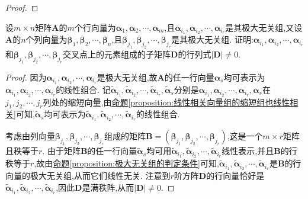 \documentclass[../../main.tex]{subfiles}%
\begin{document}
\begin{proof}
\end{proof}

\begin{proposition}\label{proposition:极大无关组对应的子式不为零}
设\(m\times n\)矩阵\(\boldsymbol{A}\)的\(m\)个行向量为\(\boldsymbol{\alpha}_1,\boldsymbol{\alpha}_2,\cdots,\boldsymbol{\alpha}_m\),且\(\boldsymbol{\alpha}_{i_1},\boldsymbol{\alpha}_{i_2},\cdots,\boldsymbol{\alpha}_{i_r}\)是其极大无关组,又设\(\boldsymbol{A}\)的\(n\)个列向量为\(\boldsymbol{\beta}_1,\boldsymbol{\beta}_2,\cdots,\boldsymbol{\beta}_n\),且\(\boldsymbol{\beta}_{j_1},\boldsymbol{\beta}_{j_2},\cdots,\boldsymbol{\beta}_{j_r}\)是其极大无关组. 证明:\(\boldsymbol{\alpha}_{i_1},\boldsymbol{\alpha}_{i_2},\cdots,\boldsymbol{\alpha}_{i_r}\)和\(\boldsymbol{\beta}_{j_1},\boldsymbol{\beta}_{j_2},\cdots,\boldsymbol{\beta}_{j_r}\)交叉点上的元素组成的子矩阵\(\boldsymbol{D}\)的行列式\(|\boldsymbol{D}|\neq0\).
\end{proposition}
\begin{proof}

因为\(\boldsymbol{\alpha}_{i_1},\boldsymbol{\alpha}_{i_2},\cdots,\boldsymbol{\alpha}_{i_r}\)是极大无关组,故\(\boldsymbol{A}\)的任一行向量\(\boldsymbol{\alpha}_s\)均可表示为\(\boldsymbol{\alpha}_{i_1},\boldsymbol{\alpha}_{i_2},\cdots,\boldsymbol{\alpha}_{i_r}\)的线性组合. 记\(\widetilde{\boldsymbol{\alpha}}_{i_1},\widetilde{\boldsymbol{\alpha}}_{i_2},\cdots,\widetilde{\boldsymbol{\alpha}}_{i_r},\widetilde{\boldsymbol{\alpha}}_s\)分别是\(\boldsymbol{\alpha}_{i_1},\boldsymbol{\alpha}_{i_2},\cdots,\boldsymbol{\alpha}_{i_r},\boldsymbol{\alpha}_s\)在\(j_1,j_2,\cdots,j_r\)列处的缩短向量,由\hyperref[proposition:线性相关向量组的缩短组也线性相关]{命题\ref{proposition:线性相关向量组的缩短组也线性相关}}可知,\(\widetilde{\boldsymbol{\alpha}}_s\)均可表示为\(\widetilde{\boldsymbol{\alpha}}_{i_1},\widetilde{\boldsymbol{\alpha}}_{i_2},\cdots,\widetilde{\boldsymbol{\alpha}}_{i_r}\)的线性组合.

考虑由列向量\(\boldsymbol{\beta}_{j_1},\boldsymbol{\beta}_{j_2},\cdots,\boldsymbol{\beta}_{j_r}\)组成的矩阵\(\boldsymbol{B}=(\boldsymbol{\beta}_{j_1},\boldsymbol{\beta}_{j_2},\cdots,\boldsymbol{\beta}_{j_r})\),这是一个\(m\times r\)矩阵且秩等于\(r\). 由于矩阵\(\boldsymbol{B}\)的任一行向量\(\widetilde{\boldsymbol{\alpha}}_s\)均可用\(\widetilde{\boldsymbol{\alpha}}_{i_1},\widetilde{\boldsymbol{\alpha}}_{i_2},\cdots,\widetilde{\boldsymbol{\alpha}}_{i_r}\)线性表示,并且\(\boldsymbol{B}\)的行秩等于\(r\),故由\hyperref[proposition:极大无关组的判定条件]{命题\ref{proposition:极大无关组的判定条件}}可知,\(\widetilde{\boldsymbol{\alpha}}_{i_1},\widetilde{\boldsymbol{\alpha}}_{i_2},\cdots,\widetilde{\boldsymbol{\alpha}}_{i_r}\)是\(\boldsymbol{B}\)的行向量的极大无关组,从而它们线性无关. 注意到\(r\)阶方阵\(\boldsymbol{D}\)的行向量恰好是\(\widetilde{\boldsymbol{\alpha}}_{i_1},\widetilde{\boldsymbol{\alpha}}_{i_2},\cdots,\widetilde{\boldsymbol{\alpha}}_{i_r}\),因此\(\boldsymbol{D}\)是满秩阵,从而\(|\boldsymbol{D}|\neq0\).

\end{proof}
\end{document}
